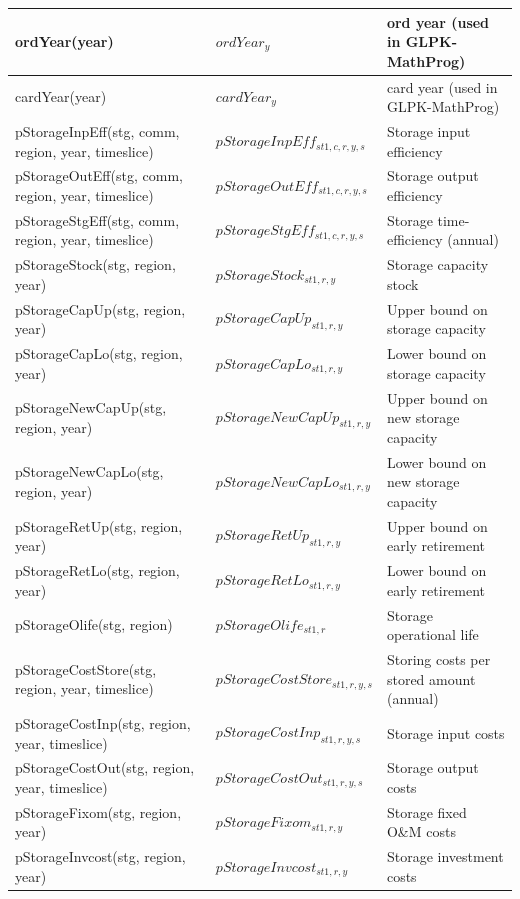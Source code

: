 \documentclass{article}
\begin{document}
\begin{longtable}{|p{10cm}|p{5cm}|p{9cm}|}
 \hline
ordYear(year) & $ordYear_{y}$ & ord year (used in GLPK-MathProg) \\
 \hline
cardYear(year) & $cardYear_{y}$ & card year (used in GLPK-MathProg) \\
 \hline
pStorageInpEff(stg, comm, region, year, timeslice) & $pStorageInpEff_{st1,c,r,y,s}$ & Storage input efficiency \\
 \hline
pStorageOutEff(stg, comm, region, year, timeslice) & $pStorageOutEff_{st1,c,r,y,s}$ & Storage output efficiency \\
 \hline
pStorageStgEff(stg, comm, region, year, timeslice) & $pStorageStgEff_{st1,c,r,y,s}$ & Storage time-efficiency (annual) \\
 \hline
pStorageStock(stg, region, year) & $pStorageStock_{st1,r,y}$ & Storage capacity stock \\
 \hline
pStorageCapUp(stg, region, year) & $pStorageCapUp_{st1,r,y}$ & Upper bound on storage capacity \\
 \hline
pStorageCapLo(stg, region, year) & $pStorageCapLo_{st1,r,y}$ & Lower bound on storage capacity \\
 \hline
pStorageNewCapUp(stg, region, year) & $pStorageNewCapUp_{st1,r,y}$ & Upper bound on new storage capacity \\
 \hline
pStorageNewCapLo(stg, region, year) & $pStorageNewCapLo_{st1,r,y}$ & Lower bound on new storage capacity \\
 \hline
pStorageRetUp(stg, region, year) & $pStorageRetUp_{st1,r,y}$ & Upper bound on early retirement \\
 \hline
pStorageRetLo(stg, region, year) & $pStorageRetLo_{st1,r,y}$ & Lower bound on early retirement \\
 \hline
pStorageOlife(stg, region) & $pStorageOlife_{st1,r}$ & Storage operational life \\
 \hline
pStorageCostStore(stg, region, year, timeslice) & $pStorageCostStore_{st1,r,y,s}$ & Storing costs per stored amount (annual) \\
 \hline
pStorageCostInp(stg, region, year, timeslice) & $pStorageCostInp_{st1,r,y,s}$ & Storage input costs \\
 \hline
pStorageCostOut(stg, region, year, timeslice) & $pStorageCostOut_{st1,r,y,s}$ & Storage output costs \\
 \hline
pStorageFixom(stg, region, year) & $pStorageFixom_{st1,r,y}$ & Storage fixed O\&M costs \\
 \hline
pStorageInvcost(stg, region, year) & $pStorageInvcost_{st1,r,y}$ & Storage investment costs \\

\end{longtable}
\end{document}
